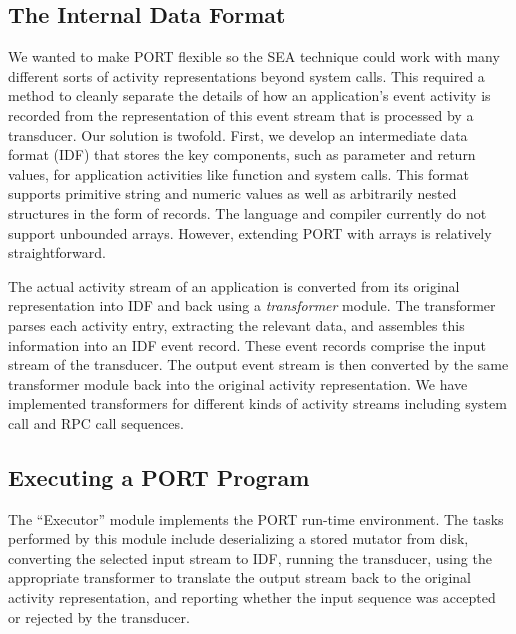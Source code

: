 \subsection{The Internal Data Format}

We wanted to make PORT flexible so the SEA technique
could
work with many different sorts of
activity representations beyond system calls.
This required a method to cleanly separate the details of how
an application's event activity is recorded from the representation of this event stream that is
processed by a transducer.
Our solution is twofold.  First, we develop an intermediate data format
(IDF) that
stores the key components, such as parameter and return values,
for application activities like function
and system calls.  This format supports primitive string and numeric
values as well as arbitrarily nested structures in the form of records.
The language and compiler currently do not support unbounded arrays. However, extending PORT with arrays is relatively straightforward.


The actual activity stream of an application is converted from its original representation into IDF and
back using a \emph{transformer} module. The transformer parses each activity entry,
extracting the relevant data, and assembles this information into an IDF
event record.  These event records comprise the input stream of the transducer.
The output event stream is then converted by the same transformer module
back into the original activity representation. We have implemented transformers for different kinds of activity streams including system call and RPC call sequences.

\subsection{Executing a PORT Program}

The ``Executor'' module implements the PORT run-time environment.
The tasks performed by this module include deserializing a stored mutator from disk,
converting the selected input stream to IDF,
running the transducer,
using the appropriate transformer to translate the output stream back to the original activity representation, and reporting whether the input sequence was
accepted or rejected by the transducer.

